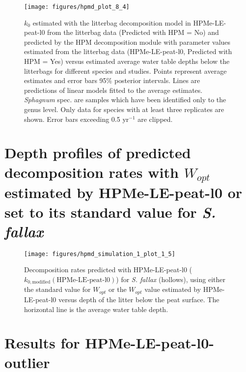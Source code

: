 \documentclass[
  12pt,
]{article}
\begin{document}
\begin{figure}[H]

{\centering \texttt{[image: figures/hpmd\_plot\_8\_4]} 

}

\caption{\(k_0\) estimated with the litterbag decomposition model in HPMe-LE-peat-l0 from the litterbag data (Predicted with HPM = No) and predicted by the HPM decomposition module with parameter values estimated from the litterbag data (HPMe-LE-peat-l0, Predicted with HPM = Yes) versus estimated average water table depths below the litterbags for different species and studies. Points represent average estimates and error bars 95\% posterior intervals. Lines are predictions of linear models fitted to the average estimates. \emph{Sphagnum} spec. are samples which have been identified only to the genus level. Only data for species with at least three replicates are shown. Error bars exceeding 0.5 yr\(^{-1}\) are clipped.}\label{fig:sup-hpmd-plot-8-4}
\end{figure}

\hypertarget{sup-9}{%
\section{\texorpdfstring{Depth profiles of predicted decomposition rates with \(W_{opt}\) estimated by HPMe-LE-peat-l0 or set to its standard value for \emph{S. fallax}}{Depth profiles of predicted decomposition rates with W\_\{opt\} estimated by HPMe-LE-peat-l0 or set to its standard value for S. fallax}}\label{sup-9}}



\begin{figure}[H]

{\centering \texttt{[image: figures/hpmd\_simulation\_1\_plot\_1\_5]} 

}

\caption{Decomposition rates predicted with HPMe-LE-peat-l0 (\(k_{0,\text{modified}}(\text{HPMe-LE-peat-l0})\)) for \emph{S. fallax} (hollows), using either the standard value for \(W_{opt}\) or the \(W_{opt}\) value estimated by HPMe-LE-peat-l0 versus depth of the litter below the peat surface. The horizontal line is the average water table depth.}\label{fig:sup-hpmd-simulation-1-plot-5}
\end{figure}

\hypertarget{sup-10}{%
\section{Results for HPMe-LE-peat-l0-outlier}\label{sup-10}}
\end{document}

